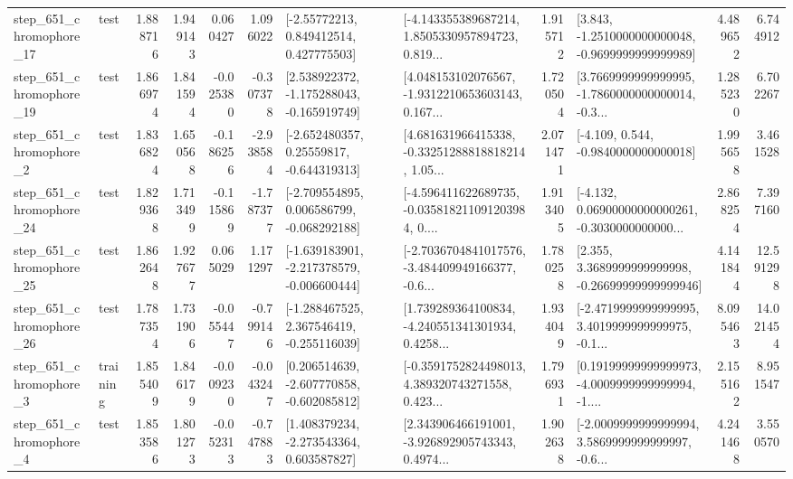 \begin{tabular}{llrrrrllrlrr}
  step\_651\_chromophore\_17 &      test &      1.888716 &    1.949143 &      0.060427 &  1.096022 &     [-2.55772213, 0.849412514, 0.427775503] &  [-4.143355389687214, 1.8505330957894723, 0.819... &       1.915712 &  [3.843, -1.2510000000000048, -0.9699999999999989] &            4.489652 &          6.744912 \\
  step\_651\_chromophore\_19 &      test &      1.866974 &    1.841594 &     -0.025380 & -0.307378 &   [2.538922372, -1.175288043, -0.165919749] &  [4.048153102076567, -1.9312210653603143, 0.167... &       1.720504 &  [3.7669999999999995, -1.7860000000000014, -0.3... &            1.285230 &          6.702267 \\
   step\_651\_chromophore\_2 &      test &      1.836824 &    1.650568 &     -0.186256 & -2.938584 &    [-2.652480357, 0.25559817, -0.644319313] &  [4.681631966415338, -0.33251288818818214, 1.05... &       2.071471 &               [-4.109, 0.544, -0.9840000000000018] &            1.995658 &          3.461528 \\
  step\_651\_chromophore\_24 &      test &      1.829368 &    1.713499 &     -0.115869 & -1.787377 &   [-2.709554895, 0.006586799, -0.068292188] &  [-4.596411622689735, -0.035818211091203984, 0.... &       1.913405 &  [-4.132, 0.06900000000000261, -0.3030000000000... &            2.868254 &          7.397160 \\
  step\_651\_chromophore\_25 &      test &      1.862648 &    1.927677 &      0.065029 &  1.171297 &  [-1.639183901, -2.217378579, -0.006600444] &  [-2.7036704841017576, -3.484409949166377, -0.6... &       1.780258 &  [2.355, 3.3689999999999998, -0.26699999999999946] &            4.141844 &         12.591298 \\
  step\_651\_chromophore\_26 &      test &      1.787354 &    1.731906 &     -0.055447 & -0.799146 &   [-1.288467525, 2.367546419, -0.255116039] &  [1.739289364100834, -4.240551341301934, 0.4258... &       1.934049 &  [-2.4719999999999995, 3.4019999999999975, -0.1... &            8.095463 &         14.021454 \\
   step\_651\_chromophore\_3 &  training &      1.855409 &    1.846179 &     -0.009230 & -0.043247 &   [0.206514639, -2.607770858, -0.602085812] &  [-0.3591752824498013, 4.389320743271558, 0.423... &       1.796931 &  [0.19199999999999973, -4.0009999999999994, -1.... &            2.155162 &          8.951547 \\
   step\_651\_chromophore\_4 &      test &      1.853586 &    1.801273 &     -0.052313 & -0.747883 &    [1.408379234, -2.273543364, 0.603587827] &  [2.343906466191001, -3.926892905743343, 0.4974... &       1.902638 &  [-2.0009999999999994, 3.5869999999999997, -0.6... &            4.241468 &          3.550570 \\

\end{tabular}
